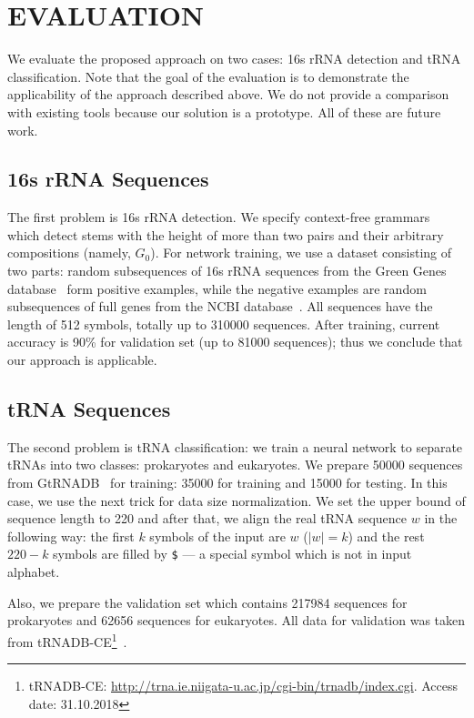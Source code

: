 \documentclass[a4paper,twoside]{article}
\begin{document}
\section{\uppercase{Evaluation}}
\label{sec:evaluation}

\noindent We evaluate the proposed approach on two cases: 16s rRNA detection and tRNA classification.
Note that the goal of the evaluation is to demonstrate the applicability of the approach described above.
We do not provide a comparison with existing tools because our solution is a prototype.
All of these are future work.

\subsection{16s rRNA Sequences}
\noindent The first problem is 16s rRNA detection.
We specify context-free grammars which detect stems with the height of more than two pairs and their arbitrary compositions (namely, $G_0$).
For network training, we use a dataset consisting of two parts: random subsequences of 16s rRNA sequences from the Green Genes database~\cite{pmid16820507} form positive examples, while the negative examples are random subsequences of full genes from the NCBI database~\cite{pmid19854944}.
All sequences have the length of 512 symbols, totally up to 310000 sequences.
After training, current accuracy is 90\% for validation set (up to 81000 sequences); thus we conclude that our approach is applicable.

\subsection{tRNA Sequences}

\noindent The second problem is tRNA classification: we train a neural network to separate tRNAs into two classes: prokaryotes and eukaryotes.
We prepare 50000 sequences from GtRNADB~\cite{Chan2009} for training: 35000 for training and 15000 for testing.
In this case, we use the next trick for data size normalization.
We set the upper bound of sequence length to 220 and after that, we align the real tRNA sequence $w$ in the following way: the first $k$ symbols of the input are $w$ ($|w|=k$) and the rest $220-k$ symbols are filled by \verb|$| --- a special symbol which is not in input alphabet.

Also, we prepare the validation set which contains 217984 sequences for prokaryotes and 62656 sequences for eukaryotes.
All data for validation was taken from tRNADB-CE\footnote{tRNADB-CE: \url{http://trna.ie.niigata-u.ac.jp/cgi-bin/trnadb/index.cgi}. Access date: 31.10.2018}~\cite{Abe2010}.
\end{document}
